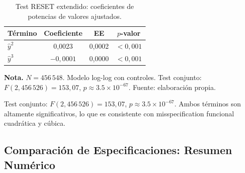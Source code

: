 \documentclass[doc, a4paper, biblatex, floatsintext, longtable, babel]{apa7}
\begin{document}
\begin{table}[!htbp]
\centering
\caption{Test RESET extendido: coeficientes de potencias de valores ajustados.}
\label{tab:appendix_reset_detail}
\footnotesize
\begin{threeparttable}
\begin{tabular}{lccc}
\toprule
Término & Coeficiente & EE & $p$-valor \\
\midrule
$\hat{y}^2$ & 0,0023 & 0,0002 & $<0,001$ \\
$\hat{y}^3$ & $-0,0001$ & 0,0000 & $<0,001$ \\
\bottomrule
\end{tabular}
\begin{tablenotes}
\footnotesize
\item \textbf{Nota.} $N = 456\,548$. Modelo log-log con controles. Test conjunto: $F(2, 456\,526) = 153,07$, $p \approx 3.5 \times 10^{-67}$. Fuente: elaboración propia.
\end{tablenotes}
\end{threeparttable}
\end{table}

Test conjunto: $F(2, 456\,526) = 153,07$, $p \approx 3.5 \times 10^{-67}$. Ambos términos son altamente significativos, lo que es consistente con misspecification funcional cuadrática y cúbica.

\subsection{Comparación de Especificaciones: Resumen Numérico}
\label{subsec:appendix_spec_summary}
\end{document}

